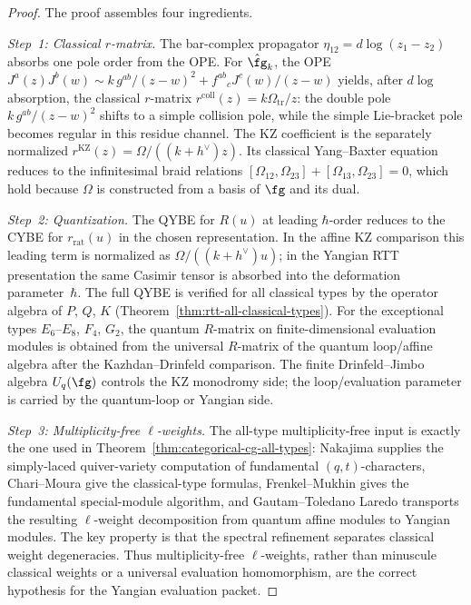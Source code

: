 \begin{proof}
The proof assembles four ingredients.

\emph{Step~1: Classical $r$-matrix.}
The bar-complex propagator $\eta_{12} = d\log(z_1 - z_2)$ absorbs
one pole order from the OPE. For $\hat{\fg}_k$, the OPE
$J^a(z)J^b(w) \sim k\,g^{ab}/(z{-}w)^2 + f^{ab}{}_c J^c(w)/(z{-}w)$
yields, after $d\log$ absorption, the classical $r$-matrix
$r^{\mathrm{coll}}(z)=k\Omega_{\mathrm{tr}}/z$: the double pole
$k\,g^{ab}/(z{-}w)^2$ shifts to a simple collision pole, while the
simple Lie-bracket pole becomes regular in this residue channel.  The
KZ coefficient is the separately normalized
$r^{\mathrm{KZ}}(z)=\Omega/((k+h^\vee)z)$.  Its classical
Yang--Baxter equation reduces to the infinitesimal braid
relations $[\Omega_{12}, \Omega_{23}] + [\Omega_{13}, \Omega_{23}] = 0$,
which hold because $\Omega$ is constructed from a basis of $\fg$ and
its dual.

\emph{Step~2: Quantization.}
The QYBE for $R(u)$ at leading $\hbar$-order reduces to the CYBE for
$r_{\mathrm{rat}}(u)$ in the chosen representation.  In the affine
KZ comparison this leading term is normalized as
$\Omega/((k+h^\vee)u)$; in the Yangian RTT presentation the same
Casimir tensor is absorbed into the deformation parameter~$\hbar$.
The full QYBE is verified for all classical types by the operator
algebra of $P$, $Q$, $K$ (Theorem~\ref{thm:rtt-all-classical-types}).
For the exceptional types $E_6$--$E_8$, $F_4$, $G_2$, the quantum
$R$-matrix on finite-dimensional evaluation modules is obtained from
the universal $R$-matrix of the quantum loop/affine algebra after the
Kazhdan--Drinfeld comparison. The finite Drinfeld--Jimbo algebra
$U_q(\fg)$ controls the KZ monodromy side; the loop/evaluation
parameter is carried by the quantum-loop or Yangian side.

\emph{Step~3: Multiplicity-free $\ell$-weights.}
The all-type multiplicity-free input is exactly the one used in
Theorem~\ref{thm:categorical-cg-all-types}: Nakajima supplies the
simply-laced quiver-variety computation of fundamental
$(q,t)$-characters, Chari--Moura give the classical-type formulas,
Frenkel--Mukhin gives the fundamental special-module algorithm, and
Gautam--Toledano Laredo transports the resulting
$\ell$-weight decomposition from quantum affine modules to Yangian
modules.  The key property is that the spectral refinement separates
classical weight degeneracies.  Thus multiplicity-free
$\ell$-weights, rather than minuscule classical weights or a universal
evaluation homomorphism, are the correct hypothesis for the Yangian
evaluation packet.


\end{proof}
